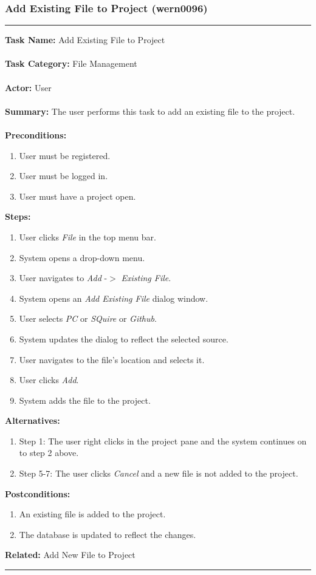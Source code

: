 \documentclass[11pt]{report}
\begin{document}
\subsubsection{Add Existing File to Project (wern0096)}
\vspace{2pt}
\hrule
\vspace{8pt}
	\noindent\textbf{Task Name:} Add Existing File to Project \\ \\
	\textbf{Task Category:} File Management \\ \\
	\textbf{Actor:} User \\ \\
	\textbf{Summary:} The user performs this task to add an existing file to the project. \\ \\
	\textbf{Preconditions:} 
	\begin{enumerate}
		\item User must be registered.
		\item User must be logged in.
		\item User must have a project open.
	\end{enumerate}
	\textbf{Steps:}
	\begin{enumerate}
		\item User clicks \textit{File} in the top menu bar.
		\item System opens a drop-down menu.
		\item User navigates to \textit{Add} -$>$ \textit{Existing File}.
		\item System opens an \textit{Add Existing File} dialog window.
		\item User selects \textit{PC} or \textit{SQuire} or \textit{Github}.
		\item System updates the dialog to reflect the selected source.
		\item User navigates to the file's location and selects it.
		\item User clicks \textit{Add}.
		\item System adds the file to the project.
	\end{enumerate}
	\textbf{Alternatives:} 
	\begin{enumerate}
		\item Step 1: The user right clicks in the project pane and the system continues on to step 2 above.
		\item Step 5-7: The user clicks \textit{Cancel} and a new file is not added to the project.
	\end{enumerate}
	\textbf{Postconditions:}
	\begin{enumerate}
		\item An existing file is added to the project.
		\item The database is updated to reflect the changes.
	\end{enumerate}
	\textbf{Related:} Add New File to Project
\vspace{8pt} 
\hrule
\newpage
\end{document}
